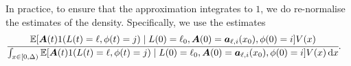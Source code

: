 In practice, to ensure that the approximation integrates to \(1\), we do re-normalise the estimates of the density. Specifically, we use the estimates
	\begin{align}
		&\cfrac{\mathbb E[\boldsymbol A(t) 1(L(t)=\ell,\phi(t)=j) \mid L(0)=\ell_0, \boldsymbol A(0) = \boldsymbol  a_{\ell,i}(x_0), \phi(0) = i]V(x)}{\int_{x\in[0,\Delta)}\mathbb E[\boldsymbol A(t) 1(L(t)=\ell,\phi(t)=j) \mid L(0)=\ell_0, \boldsymbol A(0) = \boldsymbol  a_{\ell,i}(x_0), \phi(0) = i]V(x)\, \mathrm{d} x}.
	\end{align}





















